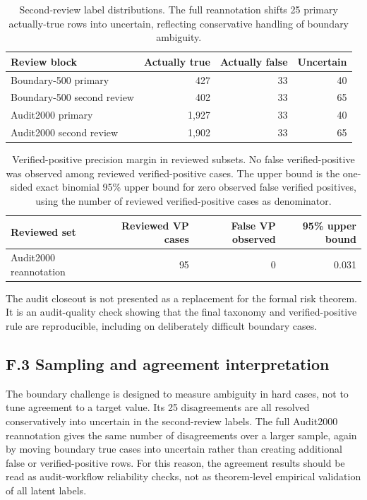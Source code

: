 \documentclass[11pt]{article}
\begin{document}
\begin{table}[h]
\centering
\caption{Second-review label distributions. The full reannotation shifts 25 primary actually-true rows into uncertain, reflecting conservative handling of boundary ambiguity.}
\small
\begin{tabular}{lrrr}
\toprule
Review block & Actually true & Actually false & Uncertain \\
\midrule
Boundary-500 primary & 427 & 33 & 40 \\
Boundary-500 second review & 402 & 33 & 65 \\
Audit2000 primary & 1,927 & 33 & 40 \\
Audit2000 second review & 1,902 & 33 & 65 \\
\bottomrule
\end{tabular}
\end{table}

\begin{table}[h]
\centering
\caption{Verified-positive precision margin in reviewed subsets. No false verified-positive was observed among reviewed verified-positive cases. The upper bound is the one-sided exact binomial 95\% upper bound for zero observed false verified positives, using the number of reviewed verified-positive cases as denominator.}
\small
\begin{tabular}{lrrr}
\toprule
Reviewed set & Reviewed VP cases & False VP observed & 95\% upper bound \\
\midrule
Audit2000 reannotation & 95 & 0 & 0.031 \\
\bottomrule
\end{tabular}
\end{table}

The audit closeout is not presented as a replacement for the formal risk theorem.
It is an audit-quality check showing that the final taxonomy and verified-positive rule are reproducible, including on deliberately difficult boundary cases.

\subsection*{F.3 Sampling and agreement interpretation}

The boundary challenge is designed to measure ambiguity in hard cases, not to tune agreement to a target value.
Its 25 disagreements are all resolved conservatively into uncertain in the second-review labels.
The full Audit2000 reannotation gives the same number of disagreements over a larger sample, again by moving boundary true cases into uncertain rather than creating additional false or verified-positive rows.
For this reason, the agreement results should be read as audit-workflow reliability checks, not as theorem-level empirical validation of all latent labels.
\end{document}
